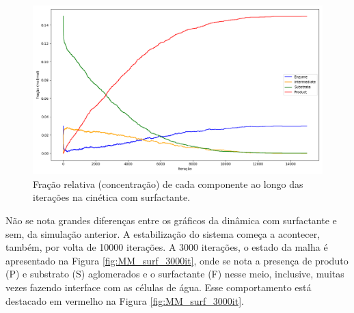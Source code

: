 \documentclass[12pt,oneside]{report}
\begin{document}
\begin{figure}[H]
    \centering
    \includegraphics[width=1\textwidth]{img/MM_surf_conc.png}
    \caption{\small Fração relativa (concentração) de cada componente ao longo das iterações na cinética com surfactante.}
    \label{fig:MM_surf_conc}
\end{figure}

Não se nota grandes diferenças entre os gráficos da dinâmica com surfactante e sem, da simulação anterior. A estabilização do sistema começa a acontecer, também, por volta de 10000 iterações. A 3000 iterações, o estado da malha é apresentado na Figura \ref{fig:MM_surf_3000it}, onde se nota a presença de produto (P) e substrato (S) aglomerados e o surfactante (F) nesse meio, inclusive, muitas vezes fazendo interface com as células de água. Esse comportamento está destacado em vermelho na Figura \ref{fig:MM_surf_3000it}.
\end{document}
